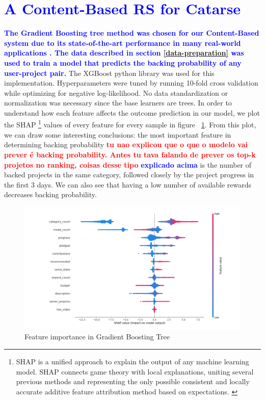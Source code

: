 \documentclass[cic,tc,english]{iiufrgs}
\newcommand{\bruno}[1]{\textcolor{red}{\textbf{#1}}}
\newcommand{\adriano}[1]{\textcolor{blue}{\textbf{#1}}}
\begin{document}
\section{\adriano{A Content-Based RS for Catarse}}
\adriano{The Gradient Boosting tree method was chosen for our Content-Based system due to its state-of-the-art performance in many real-world applications \cite{Chen2016}. The data described in section \ref{data-preparation} was used to train a model that predicts the backing probability of any user-project pair.} The XGBoost python library was used for this implementation. Hyperparameters were tuned by running 10-fold cross validation while optimizing for negative log-likelihood. No data standardization or normalization was necessary since the base learners are trees. In order to understand how each feature affects the outcome prediction in our model, we plot the SHAP \footnote{SHAP is a unified approach to explain the output of any machine learning model. SHAP connects game theory with local explanations, uniting several previous methods and representing the only possible consistent and locally accurate additive feature attribution method based on expectations. \cite{Lundberg2017}} values of every feature for every sample in figure ~\ref{fig:features_importance}. From this plot, we can draw some interesting conclusions: the most important feature in determining backing probability \bruno{tu nao explicou que o que o modelo vai prever é backing probability. Antes tu tava falando de prever os top-k projetos no ranking, coisas desse tipo} \adriano{explicado acima} is the number of backed projects in the same category, followed closely by the project progress in the first 3 days. We can also see that having a low number of available rewards decreases backing probability.

\begin{figure}[ht!]
    \caption{Feature importance in Gradient Boosting Tree}
    \begin{center}
        \includegraphics[width=\textwidth]{feature_contribution}
    \end{center}
    \label{fig:features_importance}
\end{figure}
\end{document}
